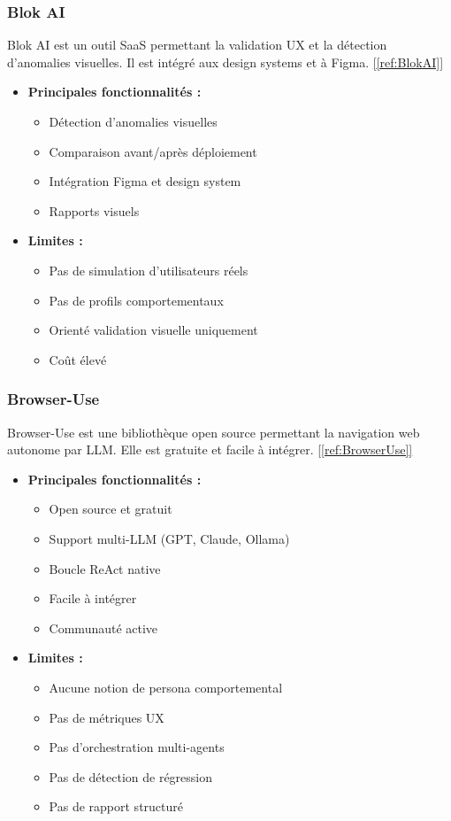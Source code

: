\subsubsection{Blok AI}
Blok AI est un outil SaaS permettant la validation UX et la détection d'anomalies visuelles. Il est intégré aux design systems et à Figma. 
\hyperlink{ref:BlokAI}{[\ref{ref:BlokAI}]}  

\begin{itemize}
    \item \textbf{Principales fonctionnalités :}
    \begin{itemize}
        \item Détection d'anomalies visuelles
        \item Comparaison avant/après déploiement
        \item Intégration Figma et design system
        \item Rapports visuels
    \end{itemize}
    \item \textbf{Limites :}
    \begin{itemize}
        \item Pas de simulation d'utilisateurs réels
        \item Pas de profils comportementaux
        \item Orienté validation visuelle uniquement
        \item Coût élevé
    \end{itemize}
\end{itemize}

\subsubsection{Browser-Use}
Browser-Use est une bibliothèque open source permettant la navigation web autonome par LLM. Elle est gratuite et facile à intégrer. 
\hyperlink{ref:BrowserUse}{[\ref{ref:BrowserUse}]}  

\begin{itemize}
    \item \textbf{Principales fonctionnalités :}
    \begin{itemize}
        \item Open source et gratuit
        \item Support multi-LLM (GPT, Claude, Ollama)
        \item Boucle ReAct native
        \item Facile à intégrer
        \item Communauté active
    \end{itemize}
    \item \textbf{Limites :}
    \begin{itemize}
        \item Aucune notion de persona comportemental
        \item Pas de métriques UX
        \item Pas d'orchestration multi-agents
        \item Pas de détection de régression
        \item Pas de rapport structuré
    \end{itemize}
\end{itemize}

